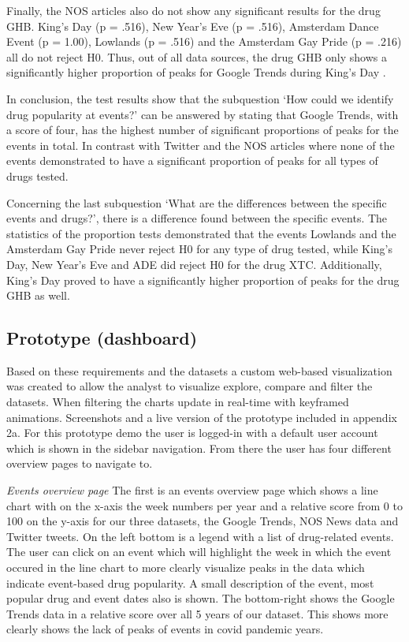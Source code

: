 Finally, the NOS articles also do not show any significant results for the drug GHB. King’s Day (p = .516), New Year’s Eve (p = .516), Amsterdam Dance Event (p = 1.00), Lowlands (p = .516) and the Amsterdam Gay Pride (p = .216) all do not reject H0. Thus, out of all data sources, the drug GHB only shows a significantly higher proportion of peaks for Google Trends during King’s Day . 

In conclusion, the test results show that the subquestion ‘How could we identify drug popularity at events?’ can be answered by stating that Google Trends, with a score of four, has the highest number of significant proportions of peaks for the events in total. In contrast with Twitter and the NOS articles where none of the events demonstrated to have a significant proportion of peaks for all types of drugs tested. 

Concerning the last subquestion ‘What are the differences between the specific events and drugs?’, there is a difference found between the specific events. The statistics of the proportion tests demonstrated that the events Lowlands and the Amsterdam Gay Pride never reject H0 for any type of drug tested, while King’s Day, New Year’s Eve and ADE did reject H0 for the drug XTC. Additionally, King’s Day proved to have a significantly higher proportion of peaks for the drug GHB as well.


\subsection {Prototype (dashboard)}\hfill

Based on these requirements and the datasets a custom web-based visualization was created to allow the analyst to visualize explore, compare and filter the datasets. When filtering the charts update in real-time with keyframed animations. Screenshots and a live version of the prototype included in appendix 2a. For this prototype demo the user is logged-in with a default user account which is shown in the sidebar navigation. From there the user has four different overview pages to navigate to. \newline


\textit{Events overview page}\newline
The first is an events overview page which shows a line chart with on the x-axis the week numbers per year and a relative score from 0 to 100 on the y-axis for our three datasets, the Google Trends, NOS News data and Twitter tweets. On the left bottom is a legend with a list of drug-related events. The user can click on an event which will highlight the week in which the event occured in the line chart to more clearly visualize peaks in the data which indicate event-based drug popularity. A small description of the event, most popular drug and event dates also is shown. The bottom-right shows the Google Trends data in a relative score over all 5 years of our dataset. This shows more clearly shows the lack of peaks of events in covid pandemic years.

